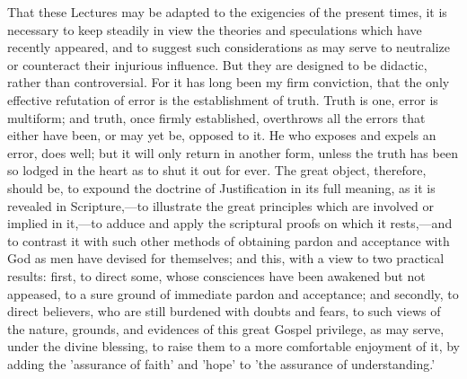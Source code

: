 \documentclass[
]{book}
\begin{document}
That these Lectures may be adapted to the exigencies of the present times, it is necessary to keep steadily in view the theories and speculations which have recently appeared, and to suggest such considerations as may serve to neutralize or counteract their injurious influence. But they are designed to be didactic, rather than controversial. For it has long been my firm conviction, that the only effective refutation of error is the establishment of truth. Truth is one, error is multiform; and truth, once firmly established, overthrows all the errors that either have been, or may yet be, opposed to it. He who exposes and expels an error, does well; but it will only return in another form, unless the truth has been so lodged in the heart as to shut it out for ever. The great object, therefore, should be, to expound the doctrine of Justification in its full meaning, as it is revealed in Scripture,---to illustrate the great principles which are involved or implied in it,---to adduce and apply the scriptural proofs on which it rests,---and to contrast it with such other methods of obtaining pardon and acceptance with God as men have devised for themselves; and this, with a view to two practical results: first, to direct some, whose consciences have been awakened but not appeased, to a sure ground of immediate pardon and acceptance; and secondly, to direct believers, who are still burdened with doubts and fears, to such views of the nature, grounds, and evidences of this great Gospel privilege, as may serve, under the divine blessing, to raise them to a more comfortable enjoyment of it, by adding the 'assurance of faith' and 'hope' to 'the assurance of understanding.'

  
\end{document}
